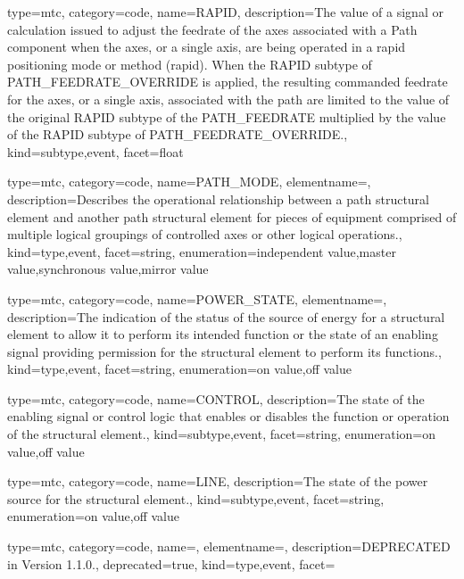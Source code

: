{
  type=mtc,
  category=code,
  name={RAPID},
  description={The value of a signal or calculation issued to adjust the feedrate of the axes associated with a Path component when the axes, or a single axis, are being operated in a rapid positioning mode or method (rapid).   \newline When the RAPID subtype of PATH\_FEEDRATE\_OVERRIDE is applied, the resulting commanded feedrate for the axes, or a single axis, associated with the path are limited to the value of the original RAPID subtype of the PATH\_FEEDRATE multiplied by the value of the RAPID subtype of PATH\_FEEDRATE\_OVERRIDE.},
  kind={subtype,event},
  facet={\gls{float}}
}


{
  type=mtc,
  category=code,
  name={PATH\_MODE},
  elementname=,
  description={Describes the operational relationship between a \gls{path} \gls{structural element} and another \gls{path} \gls{structural element} for pieces of equipment comprised of multiple logical groupings of controlled axes or other logical operations.},
  kind={type,event},
  facet={\gls{string}},
  enumeration={\gls{independent value},\gls{master value},\gls{synchronous value},\gls{mirror value}}
}


{
  type=mtc,
  category=code,
  name={POWER\_STATE},
  elementname=,
  description={The indication of the status of the source of energy for a \gls{structural element} to allow it to perform its intended function or the state of an enabling signal providing permission for the \gls{structural element} to perform its functions.},
  kind={type,event},
  facet={\gls{string}},
  enumeration={\gls{on value},\gls{off value}}
}


{
  type=mtc,
  category=code,
  name={CONTROL},
  description={The state of the enabling signal or control logic that enables or disables the function or operation of the \gls{structural element}.},
  kind={subtype,event},
  facet={\gls{string}},
  enumeration={\gls{on value},\gls{off value}}
}


{
  type=mtc,
  category=code,
  name={LINE},
  description={The state of the power source for the \gls{structural element}.},
  kind={subtype,event},
  facet={\gls{string}},
  enumeration={\gls{on value},\gls{off value}}
}


{
  type=mtc,
  category=code,
  name=,
  elementname=,
  description={DEPRECATED in Version 1.1.0.},
  deprecated={true},
  kind={type,event},
  facet={}
}


